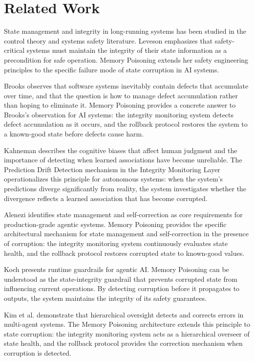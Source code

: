 \documentclass[12pt]{article}
\begin{document}
\section{Related Work}
State management and integrity in long-running systems has been studied in the control theory and systems safety literature. Leveson \cite{leveson2011} emphasizes that safety-critical systems must maintain the integrity of their state information as a precondition for safe operation. Memory Poisoning extends her safety engineering principles to the specific failure mode of state corruption in AI systems.

Brooks \cite{brooks1987} observes that software systems inevitably contain defects that accumulate over time, and that the question is how to manage defect accumulation rather than hoping to eliminate it. Memory Poisoning provides a concrete answer to Brooks's observation for AI systems: the integrity monitoring system detects defect accumulation as it occurs, and the rollback protocol restores the system to a known-good state before defects cause harm.

Kahneman \cite{kahneman2011} describes the cognitive biases that affect human judgment and the importance of detecting when learned associations have become unreliable. The Prediction Drift Detection mechanism in the Integrity Monitoring Layer operationalizes this principle for autonomous systems: when the system's predictions diverge significantly from reality, the system investigates whether the divergence reflects a learned association that has become corrupted.

Alenezi \cite{alenezi2026} identifies state management and self-correction as core requirements for production-grade agentic systems. Memory Poisoning provides the specific architectural mechanism for state management and self-correction in the presence of corruption: the integrity monitoring system continuously evaluates state health, and the rollback protocol restores corrupted state to known-good values.

Koch \cite{koch2026} presents runtime guardrails for agentic AI. Memory Poisoning can be understood as the state-integrity guardrail that prevents corrupted state from influencing current operations. By detecting corruption before it propagates to outputs, the system maintains the integrity of its safety guarantees.

Kim et al. \cite{kim2025tao} demonstrate that hierarchical oversight detects and corrects errors in multi-agent systems. The Memory Poisoning architecture extends this principle to state corruption: the integrity monitoring system acts as a hierarchical overseer of state health, and the rollback protocol provides the correction mechanism when corruption is detected.
\end{document}
